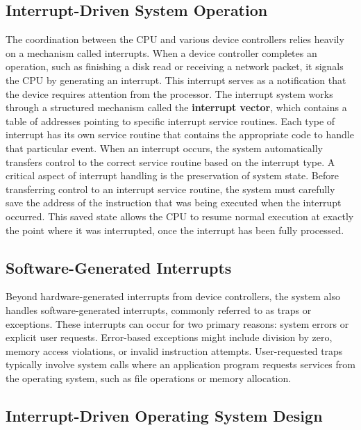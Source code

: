     \subsection{Interrupt-Driven System Operation}

    The coordination between the CPU and various device controllers relies heavily on a mechanism called interrupts. When a device controller completes an operation, such as finishing a disk read or receiving a network packet, it signals the CPU by generating an interrupt. This interrupt serves as a notification that the device requires attention from the processor.    
    The interrupt system works through a structured mechanism called the \textbf{interrupt vector}, which contains a table of addresses pointing to specific interrupt service routines. Each type of interrupt has its own service routine that contains the appropriate code to handle that particular event. When an interrupt occurs, the system automatically transfers control to the correct service routine based on the interrupt type.
    A critical aspect of interrupt handling is the preservation of system state. Before transferring control to an interrupt service routine, the system must carefully save the address of the instruction that was being executed when the interrupt occurred. This saved state allows the CPU to resume normal execution at exactly the point where it was interrupted, once the interrupt has been fully processed.


    \subsection{Software-Generated Interrupts}

    Beyond hardware-generated interrupts from device controllers, the system also handles software-generated interrupts, commonly referred to as traps or exceptions. These interrupts can occur for two primary reasons: system errors or explicit user requests. Error-based exceptions might include division by zero, memory access violations, or invalid instruction attempts. User-requested traps typically involve system calls where an application program requests services from the operating system, such as file operations or memory allocation.


    \subsection{Interrupt-Driven Operating System Design}

